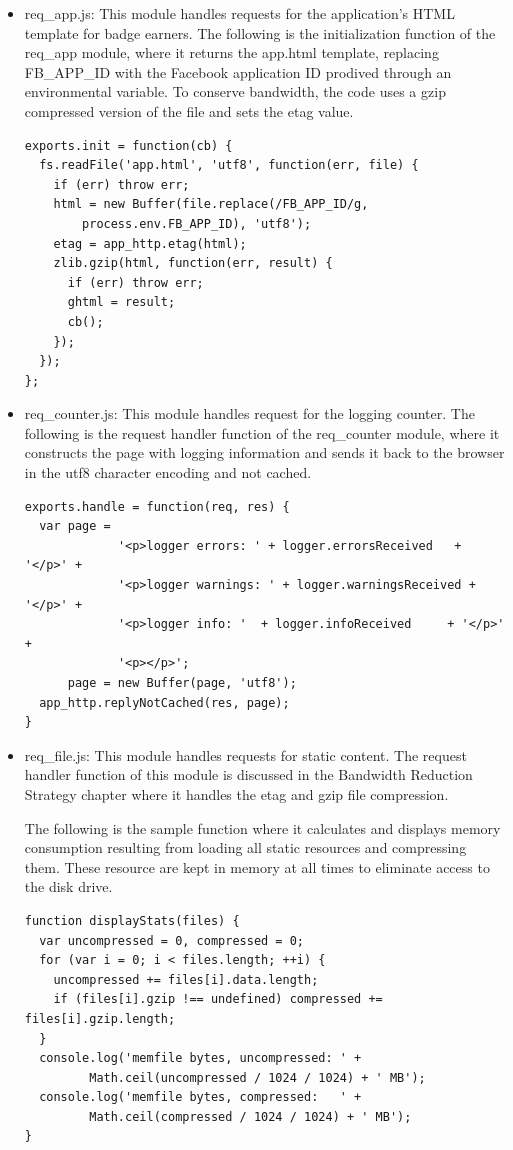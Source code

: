 \begin{itemize}
\item req{\_}app.js: This module handles requests for the application's HTML template for badge earners. The following is the initialization function of the req{\_}app module, where it returns the app.html template, replacing FB{\_}APP{\_}ID with the Facebook application ID prodived through an environmental variable.  To conserve bandwidth, the code uses a gzip compressed version of the file and sets the etag value.

\begin{lstlisting} 
exports.init = function(cb) {
  fs.readFile('app.html', 'utf8', function(err, file) {
    if (err) throw err;
    html = new Buffer(file.replace(/FB_APP_ID/g,
        process.env.FB_APP_ID), 'utf8');
    etag = app_http.etag(html);
    zlib.gzip(html, function(err, result) {
      if (err) throw err;
      ghtml = result;
      cb();
    });
  });
};
\end{lstlisting} 

\item req{\_}counter.js: This module handles request for the logging counter. The following is the request handler function of the req{\_}counter module, where it constructs the page with logging information and sends it back to the browser in the utf8 character encoding and not cached. 

\begin{lstlisting} 
exports.handle = function(req, res) {
  var page =   
             '<p>logger errors: ' + logger.errorsReceived   + '</p>' +
             '<p>logger warnings: ' + logger.warningsReceived + '</p>' +
             '<p>logger info: '  + logger.infoReceived     + '</p>' +
             '<p></p>';
      page = new Buffer(page, 'utf8');
  app_http.replyNotCached(res, page);
}
\end{lstlisting} 

\item req{\_}file.js: This module handles requests for static content. The request handler function of this module is discussed in the Bandwidth Reduction Strategy chapter where it handles the etag and gzip file compression.

The following is the sample function where it calculates and displays memory consumption resulting from loading all static resources and compressing them.  These resource are kept in memory at all times to eliminate access to the disk drive. 
\begin{lstlisting} 
function displayStats(files) {
  var uncompressed = 0, compressed = 0;
  for (var i = 0; i < files.length; ++i) {
    uncompressed += files[i].data.length;
    if (files[i].gzip !== undefined) compressed += files[i].gzip.length;
  }
  console.log('memfile bytes, uncompressed: ' + 
         Math.ceil(uncompressed / 1024 / 1024) + ' MB');
  console.log('memfile bytes, compressed:   ' + 
         Math.ceil(compressed / 1024 / 1024) + ' MB');
}
\end{lstlisting} 
  

\end{itemize}
